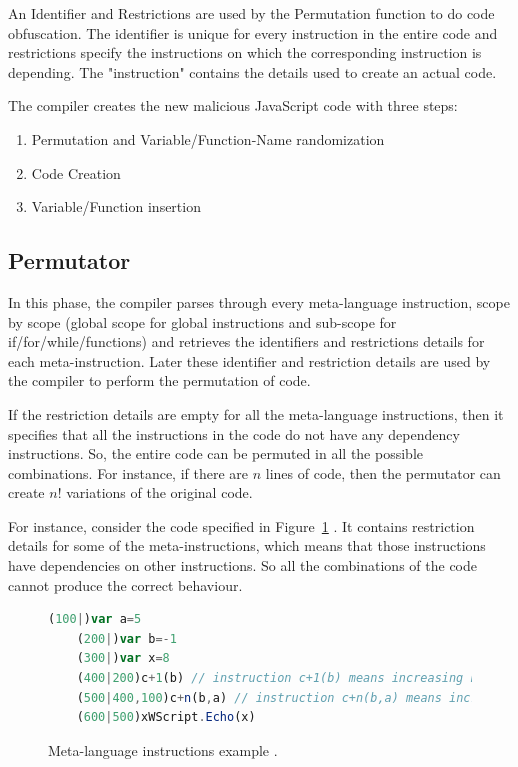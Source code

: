 An Identifier and Restrictions are used by the Permutation function to do code obfuscation. The identifier is unique for every instruction in the entire code and restrictions specify the instructions on which the corresponding instruction is depending. The "instruction" contains the details used to create an actual code. 

The compiler creates the new malicious JavaScript code with three steps:

\begin{enumerate}
  \item Permutation and Variable/Function-Name randomization
  \item Code Creation
  \item Variable/Function insertion
\end{enumerate}

\subsection{Permutator}

In this phase, the compiler parses through every meta-language instruction, scope by scope (global scope for global instructions and sub-scope for if/for/while/functions) and retrieves the identifiers and restrictions details for each meta-instruction. Later these identifier and restriction details are used by the compiler to perform the permutation of code.

If the restriction details are empty for all the meta-language instructions, then it specifies that all the instructions in the code do not have any dependency instructions. So, the entire code can be permuted in all the possible combinations. For instance, if there are $n$ lines of code, then the permutator can create $n!$ variations of the original code. 

For instance, consider the code specified in Figure~\ref{fig:permutator} \cite{bib4}. It contains restriction details for some of the meta-instructions, which means that those instructions have dependencies on other instructions. So all the combinations of the code cannot produce the correct behaviour. 


\begin{figure}
  \centering
  \begin{lstlisting}[language=JavaScript]
	(100|)var a=5
	(200|)var b=-1
	(300|)var x=8
	(400|200)c+1(b)	// instruction c+1(b) means increasing b by 1: i.e. b++
	(500|400,100)c+n(b,a) // instruction c+n(b,a) means increasing b by a: i.e. b+=a
	(600|500)xWScript.Echo(x)
\end{lstlisting}


    \caption[Meta-language instructions example]{Meta-language instructions example \cite{bib4}.}
    \label{fig:permutator}
\end{figure}


